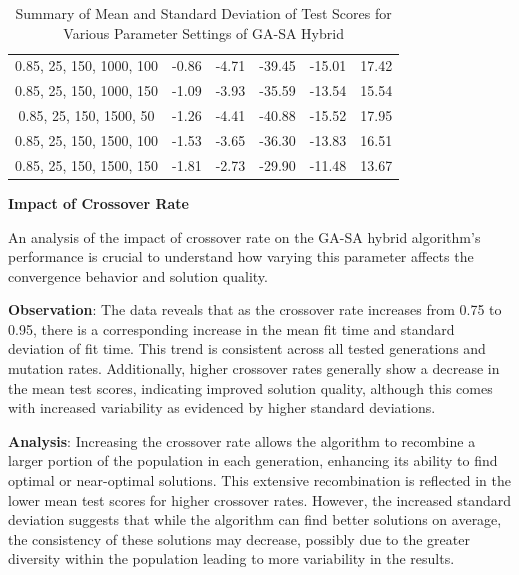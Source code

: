 \documentclass[
]{article}
\begin{document}
\begin{table}[H]
{\begin{tabular}{|c|c|c|c|c|c|}
                0.85, 25, 150, 1000, 100   & -0.86                      & -4.71                      & -39.45                     & -15.01                   & 17.42                   \\
                0.85, 25, 150, 1000, 150   & -1.09                      & -3.93                      & -35.59                     & -13.54                   & 15.54                   \\
                0.85, 25, 150, 1500, 50    & -1.26                      & -4.41                      & -40.88                     & -15.52                   & 17.95                   \\
                0.85, 25, 150, 1500, 100   & -1.53                      & -3.65                      & -36.30                     & -13.83                   & 16.51                   \\
                0.85, 25, 150, 1500, 150   & -1.81                      & -2.73                      & -29.90                     & -11.48                   & 13.67                   \\
                \hline
            \end{tabular}
        }
        \caption{Summary of Mean and Standard Deviation of Test Scores for Various Parameter Settings of GA-SA Hybrid}
        \label{tab:gasa_summary_test_scores}
    \end{table}


    \textbf{Impact of Crossover Rate}

    An analysis of the impact of crossover rate on the GA-SA hybrid algorithm’s performance is crucial to understand how varying this parameter affects the convergence behavior and solution quality.

    \textbf{Observation}: The data reveals that as the crossover rate increases from 0.75 to 0.95, there is a corresponding increase in the mean fit time and standard deviation of fit time. This trend is consistent across all tested generations and mutation rates. Additionally, higher crossover rates generally show a decrease in the mean test scores, indicating improved solution quality, although this comes with increased variability as evidenced by higher standard deviations.

    \textbf{Analysis}: Increasing the crossover rate allows the algorithm to recombine a larger portion of the population in each generation, enhancing its ability to find optimal or near-optimal solutions. This extensive recombination is reflected in the lower mean test scores for higher crossover rates. However, the increased standard deviation suggests that while the algorithm can find better solutions on average, the consistency of these solutions may decrease, possibly due to the greater diversity within the population leading to more variability in the results.
\end{document}
